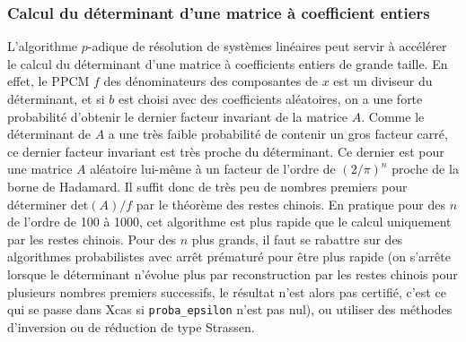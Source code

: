 \documentclass[a4paper,11pt]{article}
\begin{document}
\begin{giacjshere}
\subsubsection{Calcul du d\'eterminant d'une matrice \`a coefficient entiers}
L'algorithme $p$-adique de r\'esolution de syst\`emes
lin\'eaires peut servir \`a acc\'el\'erer le calcul du
d\'eterminant d'une matrice \`a coefficients entiers de grande taille.
En effet, le PPCM $f$ des d\'enominateurs des composantes de $x$ est
un diviseur du d\'eterminant, et si $b$ est choisi avec des
coefficients al\'eatoires, on a une forte probabilit\'e d'obtenir
le dernier facteur invariant de la matrice $A$. Comme le d\'eterminant
de $A$ a une tr\`es faible probabilit\'e de contenir un gros facteur
carr\'e, ce dernier facteur invariant est tr\`es proche du
d\'eterminant. Ce dernier est pour une matrice $A$ al\'eatoire
lui-m\^eme \`a un facteur de l'ordre de $(2/\pi)^n$ proche
de la borne de Hadamard. Il suffit donc de tr\`es peu de nombres
premiers pour d\'eterminer det$(A)/f$ par le th\'eor\`eme
des restes chinois. En pratique pour des $n$ de l'ordre de 100
\`a 1000, cet algorithme est plus rapide que le calcul uniquement
par les restes chinois. Pour des $n$ plus grands, il faut se
rabattre sur des algorithmes probabilistes avec arr\^et pr\'ematur\'e
pour \^etre plus rapide (on s'arr\^ete lorsque le d\'eterminant
n'\'evolue plus par reconstruction par les restes chinois 
pour plusieurs nombres premiers successifs, le r\'esultat n'est
alors pas certifi\'e, c'est ce qui se passe dans Xcas si
\verb|proba_epsilon| n'est pas nul), 
ou utiliser des m\'ethodes
d'inversion ou de r\'eduction de type Strassen.


\end{giacjshere}
\end{document}
